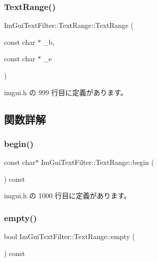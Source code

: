 \subsubsection{\texorpdfstring{Text\+Range()}{TextRange()}\hspace{0.1cm}{\footnotesize\ttfamily [2/2]}}
{\footnotesize\ttfamily Im\+Gui\+Text\+Filter\+::\+Text\+Range\+::\+Text\+Range (\begin{DoxyParamCaption}\item[{const char $\ast$}]{\+\_\+b,  }\item[{const char $\ast$}]{\+\_\+e }\end{DoxyParamCaption})\hspace{0.3cm}{\ttfamily [inline]}}



 imgui.\+h の 999 行目に定義があります。



\subsection{関数詳解}
\mbox{\label{struct_im_gui_text_filter_1_1_text_range_ab6b04c316f081e8ad7b044a8afbda63c}} 
\subsubsection{\texorpdfstring{begin()}{begin()}}
{\footnotesize\ttfamily const char$\ast$ Im\+Gui\+Text\+Filter\+::\+Text\+Range\+::begin (\begin{DoxyParamCaption}{ }\end{DoxyParamCaption}) const\hspace{0.3cm}{\ttfamily [inline]}}



 imgui.\+h の 1000 行目に定義があります。

\mbox{\label{struct_im_gui_text_filter_1_1_text_range_ab8d74e3b0ce63997746828e4b8ae3bbf}} 
\subsubsection{\texorpdfstring{empty()}{empty()}}
{\footnotesize\ttfamily bool Im\+Gui\+Text\+Filter\+::\+Text\+Range\+::empty (\begin{DoxyParamCaption}{ }\end{DoxyParamCaption}) const\hspace{0.3cm}{\ttfamily [inline]}}



